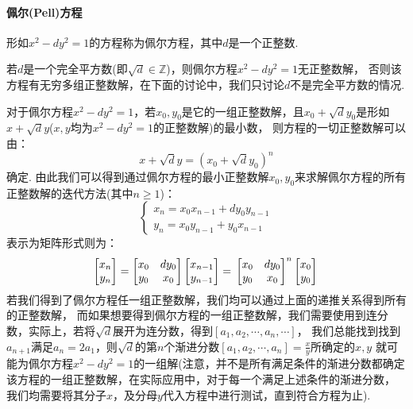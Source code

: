 \documentclass{book}
\numberwithin{equation}{subsubsection}
\begin{document}
\paragraph{\textbf{佩尔(Pell)方程}}
形如$x^2-dy^2=1$的方程称为佩尔方程，其中$d$是一个正整数.\par
若$d$是一个完全平方数(即$\sqrt{d}\in\mathbb{Z}$)，则佩尔方程$x^2-dy^2=1$无正整数解，
否则该方程有无穷多组正整数解，在下面的讨论中，我们只讨论$d$不是完全平方数的情况.\par
对于佩尔方程$x^2-dy^2=1$，若$x_0,y_0$是它的一组正整数解，且$x_0+\sqrt{d}y_0$是形如$x+\sqrt{d}y$($x,y$均为$x^2-dy^2=1$的正整数解)的最小数，
则方程的一切正整数解可以由：
\begin{equation}
    x+\sqrt{d}y=(x_0+\sqrt{d}y_0)^n
    \nonumber
\end{equation}
确定.
由此我们可以得到通过佩尔方程的最小正整数解$x_0,y_0$来求解佩尔方程的所有正整数解的迭代方法(其中$n\ge1$)：
\begin{equation}
    \begin{cases}
        x_{n}=x_0x_{n-1}+dy_0y_{n-1}\\
        y_{n}=x_0y_{n-1}+y_0x_{n-1}
    \end{cases}
    \nonumber
\end{equation}
表示为矩阵形式则为：
\begin{equation}
    \begin{bmatrix}
        x_n\\
        y_n
    \end{bmatrix}=
    \begin{bmatrix}
        x_0&dy_0\\
        y_0&x_0
    \end{bmatrix}
    \begin{bmatrix}
        x_{n-1}\\
        y_{n-1}
    \end{bmatrix}=\\
    \begin{bmatrix}
        x_0&dy_0\\
        y_0&x_0
    \end{bmatrix}^n
    \begin{bmatrix}
        x_{0}\\
        y_{0}
    \end{bmatrix}\\
    \nonumber
\end{equation}
若我们得到了佩尔方程任一组正整数解，我们均可以通过上面的递推关系得到所有的正整数解，
而如果想要得到佩尔方程的一组正整数解，我们需要使用到连分数，实际上，若将$\sqrt{d}$展开为连分数，得到$[a_1,a_2,\cdots,a_n,\cdots]$，
我们总能找到找到$a_{n+1}$满足$a_n=2a_1$，则$\sqrt{d}$的第$n$个渐进分数$[a_1,a_2,\cdots,a_{n}]=\frac{x}{y}$所确定的$x,y$
就可能为佩尔方程$x^2-dy^2=1$的一组解(注意，并不是所有满足条件的渐进分数都确定该方程的一组正整数解，在实际应用中，对于每一个满足上述条件的渐进分数，
我们均需要将其分子$x$，及分母$y$代入方程中进行测试，直到符合方程为止).
\end{document}
